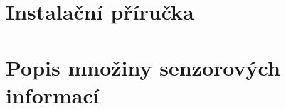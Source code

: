\documentclass[thesis=M,czech]{FITthesis}[2012/06/26]
\begin{document}
\chapter{Instalační příručka}

\chapter{Popis množiny senzorových informací}


% 
% 
% 
% 
% 
\end{document}
